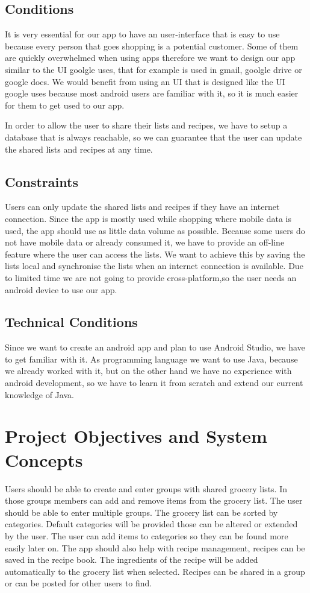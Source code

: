 \documentclass[12pt]{article}
\theoremstyle{definition}
\begin{document}
\subsection{Conditions}
It is very essential for our app to have an user-interface that is easy to use because every person that goes shopping is a potential customer. Some of them are quickly overwhelmed when using apps therefore we want to design our app similar to the UI goolgle uses, that for example  is used in  gmail, goolgle drive or google docs. We would benefit from using an UI that is designed like the UI google uses because most android users are familiar with it, so it is much easier for them to get used to our app.

In order to allow the user to share their lists and recipes, we have to setup a database that is always reachable, so we can guarantee that the user can update the shared lists and recipes at any time.

\subsection{Constraints}
Users can only update the shared lists and recipes if they have an internet connection. Since the app is mostly used while shopping where mobile data is used, the app should use as little data volume as possible. Because some users do not have mobile data or already consumed it, we have to provide an off-line feature where the user can access the lists. We want to achieve this by saving the lists local and synchronise the lists when an internet connection is available.
Due to limited time we are not going to provide cross-platform,so the user needs an android device to use our app.
\subsection{Technical Conditions}
Since we want to create an android app and plan to use Android Studio, we have to get familiar with it. As programming language we want to use Java, because we already worked with it, but on the other hand we have no experience with android development, so we have to learn it from scratch and extend our current knowledge of Java.
\pagebreak

\section{Project Objectives and System Concepts}

Users should be able to create and enter groups with shared grocery lists. In those groups members can add and remove items from the grocery list. The user should be able to enter multiple groups. The grocery list can be sorted by categories. Default categories will be provided those can be altered or extended by the user. The user can add items to categories so they can be found more easily later on. The app should also help with recipe management, recipes can be saved in the recipe book. The ingredients of the recipe will be added automatically to the grocery list when selected. Recipes can be shared in a group or can be posted for other users to find. 
\end{document}
